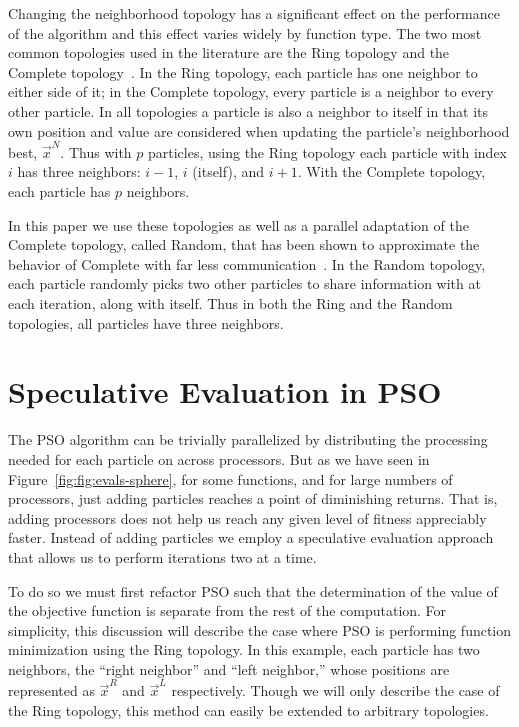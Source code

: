 \documentclass[journal,letterpaper]{IEEEtran}
\newcommand{\fig}[1]{Figure~\ref{fig:#1}}
\providecommand{\neigh}{\ensuremath{N}}
\providecommand{\leftind}{\ensuremath{L}}
\providecommand{\rightind}{\ensuremath{R}}
\providecommand{\nbest}{\ensuremath{\Vec{x}^\neigh}}
\providecommand{\leftn}{\ensuremath{\Vec{x}^\leftind}}
\providecommand{\rightn}{\ensuremath{\Vec{x}^\rightind}}
\begin{document}
Changing the
neighborhood topology has a significant effect on the performance of the
algorithm and this effect varies widely by function type.  The two most common
topologies used in the literature are the Ring topology and the Complete
topology~\cite{bratton-2007-defining-a-standard-for-pso}.  In the Ring topology, each particle has one
neighbor to either side of it; in the Complete topology, every particle is a
neighbor to every other particle.  In all topologies a particle is also a
neighbor to itself in that its own position and value are considered when
updating the particle's neighborhood best, $\nbest$.  Thus with $p$ particles,
using the Ring topology each particle with index $i$ has three neighbors:
$i-1$, $i$ (itself), and $i+1$.  With the Complete topology, each particle has
$p$ neighbors.

In this paper we use these topologies as well as a parallel adaptation of the
Complete topology, called Random, that has been shown to approximate the
behavior of Complete with far less communication~\cite{mcnabb-2009-large-particle-swarms}.  In the
Random topology, each particle randomly picks two other particles to share
information with at each iteration, along with itself.  Thus in both the Ring
and the Random topologies, all particles have three neighbors.

\section{Speculative Evaluation in PSO}
\label{sec:sepso}

The PSO algorithm can be trivially parallelized by distributing the processing
needed for each particle on across processors.  But as we have seen in
\fig{fig:evals-sphere}, for some functions, and for large numbers of
processors, just adding particles reaches a point of diminishing returns.
That is, adding processors does not help us reach any given level of fitness
appreciably faster.  Instead of adding particles we employ a speculative
evaluation approach that allows us to perform iterations two at a time.

To do so we must first refactor PSO such that the determination of the value
of the objective function is separate from the rest of the computation.  For
simplicity, this discussion will describe the case where PSO is performing
function minimization using the Ring topology.  In this example, each particle
has two neighbors, the ``right neighbor'' and ``left neighbor,'' whose
positions are represented as $\rightn$ and $\leftn$ respectively.  Though we
will only describe the case of the Ring topology, this method can easily be
extended to arbitrary topologies.
\end{document}
